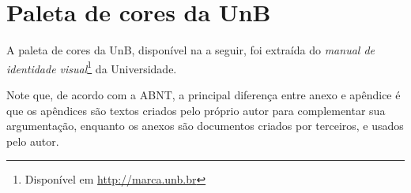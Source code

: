 \chapter{Paleta de cores da UnB}\label{anx:coresunb}

A paleta de cores da UnB, disponível na  a seguir, foi extraída do \emph{manual de identidade visual}\footnote{Disponível em \url{http://marca.unb.br}} da Universidade.

Note que, de acordo com a ABNT, a principal diferença entre anexo e apêndice é que os apêndices são textos criados pelo próprio autor para complementar sua argumentação, enquanto os anexos são documentos criados por terceiros, e usados pelo autor.

\cleardoublepage




\cleardoublepage
